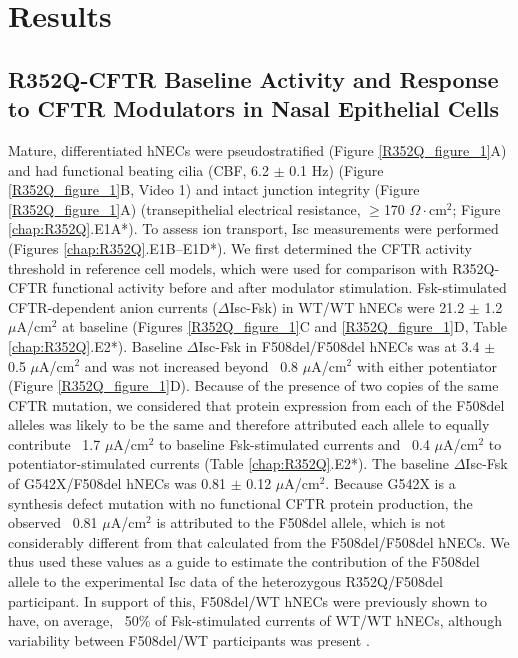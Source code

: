 \section{Results}
\subsection{R352Q-CFTR Baseline Activity and Response to CFTR Modulators in Nasal Epithelial Cells}
Mature, differentiated hNECs were pseudostratified (Figure \ref{R352Q_figure_1}A) and had functional beating cilia (CBF, 6.2 $\pm$ 0.1 Hz) (Figure \ref{R352Q_figure_1}B, Video 1) and intact junction integrity (Figure \ref{R352Q_figure_1}A) (transepithelial electrical resistance, $\geq$170 $\Omega\cdot$cm$^2$; Figure \ref{chap:R352Q}.E1A*). To assess ion transport, Isc measurements were performed (Figures \ref{chap:R352Q}.E1B–E1D*). We first determined the CFTR activity threshold in reference cell models, which were used for comparison with R352Q-CFTR functional activity before and after modulator stimulation. Fsk-stimulated CFTR-dependent anion currents ($\Delta$Isc-Fsk) in WT/WT hNECs were 21.2 $\pm$ 1.2 $\mu$A/cm$^2$ at baseline (Figures \ref{R352Q_figure_1}C and \ref{R352Q_figure_1}D, Table \ref{chap:R352Q}.E2*). Baseline $\Delta$Isc-Fsk in F508del/F508del hNECs was at 3.4 $\pm$ 0.5 $\mu$A/cm$^2$ and was not increased beyond ~0.8 $\mu$A/cm$^2$ with either potentiator (Figure \ref{R352Q_figure_1}D). Because of the presence of two copies of the same CFTR mutation, we considered that protein expression from each of the F508del alleles was likely to be the same and therefore attributed each allele to equally contribute ~1.7 $\mu$A/cm$^2$ to baseline Fsk-stimulated currents and ~0.4 $\mu$A/cm$^2$ to potentiator-stimulated currents (Table \ref{chap:R352Q}.E2*). The baseline $\Delta$Isc-Fsk of G542X/F508del hNECs was 0.81 $\pm$ 0.12 $\mu$A/cm$^2$. Because G542X is a synthesis defect mutation with no functional CFTR protein production, the observed ~0.81 $\mu$A/cm$^2$ is attributed to the F508del allele, which is not considerably different from that calculated from the F508del/F508del hNECs. We thus used these values as a guide to estimate the contribution of the F508del allele to the experimental Isc data of the heterozygous R352Q/F508del participant. In support of this, F508del/WT hNECs were previously shown to have, on average, ~50\% of Fsk-stimulated currents of WT/WT hNECs, although variability between F508del/WT participants was present \cite{pranke2017}.


